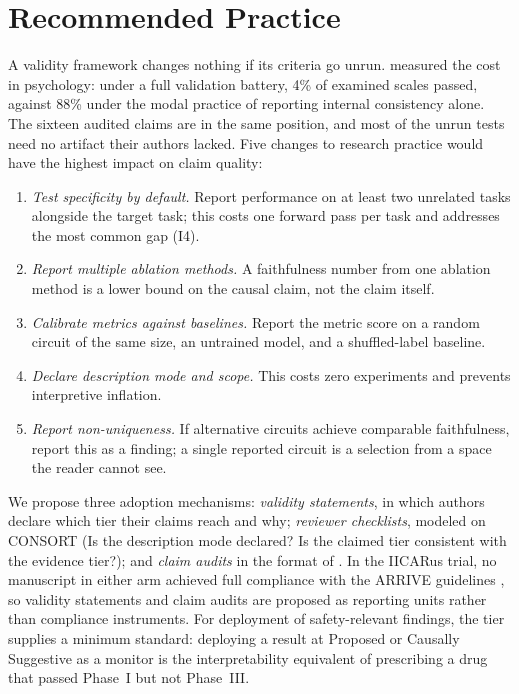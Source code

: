 \documentclass{article}
\begin{document}
\section{Recommended Practice}
\label{sec:practice}

A validity framework changes nothing if its criteria go unrun. \citet{hussey2020hidden} measured the cost in psychology: under a full validation battery, 4\% of examined scales passed, against 88\% under the modal practice of reporting internal consistency alone. The sixteen audited claims are in the same position, and most of the unrun tests need no artifact their authors lacked. Five changes to research practice would have the highest impact on claim quality:
\begin{enumerate}[nosep]
\item \emph{Test specificity by default.} Report performance on at least two unrelated tasks alongside the target task; this costs one forward pass per task and addresses the most common gap (I4).
\item \emph{Report multiple ablation methods.} A faithfulness number from one ablation method is a lower bound on the causal claim, not the claim itself.
\item \emph{Calibrate metrics against baselines.} Report the metric score on a random circuit of the same size, an untrained model, and a shuffled-label baseline.
\item \emph{Declare description mode and scope.} This costs zero experiments and prevents interpretive inflation.
\item \emph{Report non-uniqueness.} If alternative circuits achieve comparable faithfulness, report this as a finding; a single reported circuit is a selection from a space the reader cannot see.
\end{enumerate}

We propose three adoption mechanisms: \emph{validity statements}, in which authors declare which tier their claims reach and why; \emph{reviewer checklists}, modeled on CONSORT (Is the description mode declared? Is the claimed tier consistent with the evidence tier?); and \emph{claim audits} in the format of . In the IICARus trial, no manuscript in either arm achieved full compliance with the ARRIVE guidelines \citep{hair2019randomised}, so validity statements and claim audits are proposed as reporting units rather than compliance instruments. For deployment of safety-relevant findings, the tier supplies a minimum standard: deploying a result at Proposed or Causally Suggestive as a monitor is the interpretability equivalent of prescribing a drug that passed Phase~I but not Phase~III.
\end{document}
